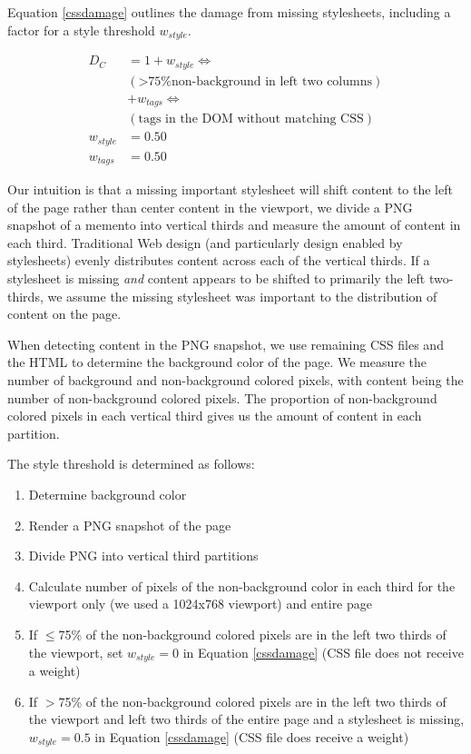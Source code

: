 Equation \ref{cssdamage} outlines the damage from missing stylesheets, including a factor for a style threshold $w_{style}$. 


\begin{equation}
\label{cssdamage}
\begin{split}
D_C &= 1 + w_{style} \iff\\&(\text{>75\% non-background in
 left two columns}) 
\\& + w_{tags} \iff\\&(\text{tags in the DOM
 without matching CSS})\\
w_{style} &= 0.50\\
w_{tags} &= 0.50
\end{split}
\end{equation}


Our intuition is that a missing important stylesheet will shift content to the left of the page rather than center content in the viewport, we divide a PNG snapshot of a memento into vertical thirds and measure the amount of content in each third. Traditional Web design (and particularly design enabled by stylesheets) evenly distributes content across each of the vertical thirds. If a stylesheet is missing \emph{and} content appears to be shifted to primarily the left two-thirds, we assume the missing stylesheet was important to the distribution of content on the page.

When detecting content in the PNG snapshot, we use remaining CSS files and the HTML to determine the background color of the page. We measure the number of background and non-background colored pixels, with content being the number of non-background colored pixels. The proportion of non-background colored pixels in each vertical third gives us the amount of content in each partition.

The style threshold is determined as follows:

\begin{enumerate}
  \item Determine background color
  \item Render a PNG snapshot of the page
  \item Divide PNG into vertical third partitions
  \item Calculate number of pixels of the non-background color in each third for the viewport only (we used a 1024x768 viewport) and entire page
  \item If $\le$75\% of the non-background colored pixels are in the left two thirds of the viewport, set \emph{$w_{style}=0$} in Equation \ref{cssdamage} (CSS file does not receive a weight)
  \item If $>$75\% of the non-background colored pixels are in the left two thirds of the viewport and left two thirds of the entire page and a stylesheet is missing, \emph{$w_{style}=0.5$} in Equation \ref{cssdamage} (CSS file does receive a weight)
\end{enumerate}

